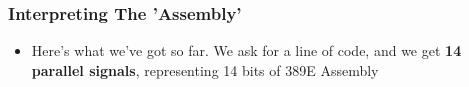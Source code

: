 \documentclass{beamer}
\begin{document}
			\begin{frame}
				\frametitle{Interpreting The 'Assembly'}
				\begin{itemize}
					\item Here's what we've got so far. We ask for a line of code, and we get \textbf{14 parallel signals}, representing 14 bits of 389E Assembly
				\end{itemize}
				
				{
				\centering
				


\begin{tikzpicture}[x=0.75pt,y=0.75pt,yscale=-1,xscale=1]


\end{tikzpicture}}
\end{frame}
\end{document}
